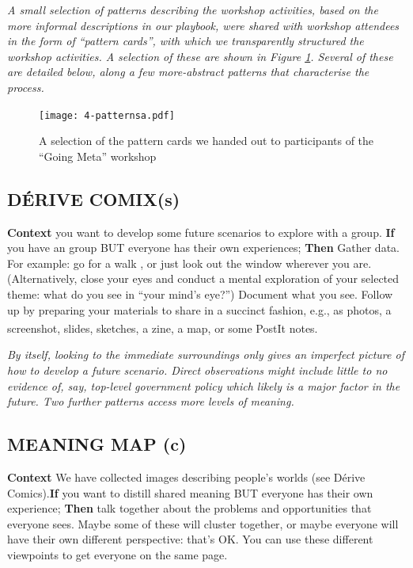 \documentclass[acmlarge,timestamp]{acmart}
\newcommand{\cognitive}{(c)}
\begin{document}
\emph{A small selection of patterns describing the workshop
activities, based on the more informal descriptions in our playbook,
were shared with workshop attendees in the form of “pattern cards”,
with which we transparently structured the workshop activities.  A
selection of these are shown in Figure \ref{cards}.  Several of these
are detailed below, along a few more-abstract patterns that
characterise the process.}

\begin{figure}
  \texttt{[image: 4-patternsa.pdf]}
\caption{A selection of the pattern cards we handed out to participants of the “Going Meta” workshop\label{cards}}
\end{figure}

\subsection*{DÉRIVE COMIX{\hfill (s)}}

\textbf{Context} you want to develop some future scenarios to explore with a group.\newline
\textbf{If} you have an group BUT everyone has their own experiences;\newline
\textbf{Then} Gather data.  For example: go for a walk \cite{debord},  or just look out the window wherever you are.  (Alternatively, close your eyes and conduct a mental exploration of your selected theme: what do you see in “your mind’s eye?”) Document what you see.  Follow up by preparing your materials to share in a succinct fashion, e.g., as photos, a screenshot, slides, sketches, a zine, a map, or some PostIt\textsuperscript{\textregistered} notes.

\smallskip
\noindent \emph{By itself, looking to the immediate surroundings only
gives an imperfect picture of how to develop a future scenario.
Direct observations might include little to no evidence of, say,
top-level government policy which likely is a major factor in the
future.  Two further patterns access more levels of meaning.}

\subsection*{MEANING MAP {\hfill\cognitive}}

\textbf{Context} We have collected images describing people’s worlds
(see {\sc Dérive Comics}).\newline \textbf{If} you want to distill
shared meaning BUT everyone has their own experience;\newline
\textbf{Then} talk together about the problems and opportunities that
everyone sees.  Maybe some of these will cluster together, or maybe
everyone will have their own different perspective: that’s OK.  You
can use these different viewpoints to get everyone on the same
page.\newline\smallskip
\end{document}
